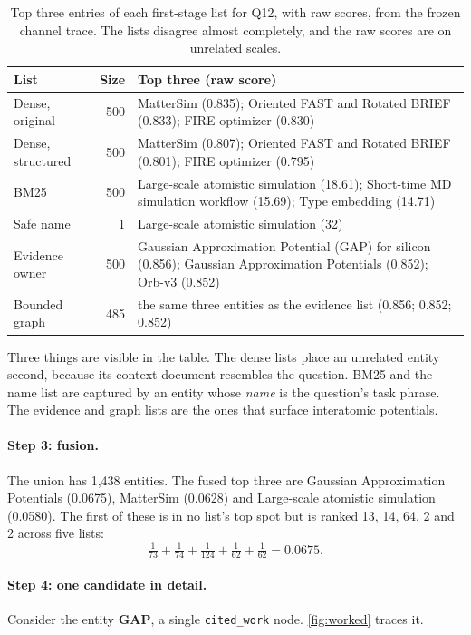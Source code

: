 \documentclass[11pt,a4paper]{article}
\newcommand{\Cref}[1]{\autoref{#1}}
\theoremstyle{remark}
\newcommand{\code}[1]{\texttt{\small #1}}
\begin{document}
\begin{table}[!htbp]
\centering
\caption[Top entries of each first-stage list for Q12]{Top three entries of each first-stage list for Q12, with raw scores, from the
frozen channel trace. The lists disagree almost completely, and the raw scores are on
unrelated scales.}
\label{tab:worked-channels}
\small
\begin{tabularx}{\linewidth}{p{3.0cm}rX}
\toprule
List & Size & Top three (raw score)\\
\midrule
Dense, original & 500 & MatterSim (0.835); Oriented FAST and Rotated BRIEF (0.833); FIRE optimizer (0.830)\\
Dense, structured & 500 & MatterSim (0.807); Oriented FAST and Rotated BRIEF (0.801); FIRE optimizer (0.795)\\
BM25 & 500 & Large-scale atomistic simulation (18.61); Short-time MD simulation workflow (15.69); Type embedding (14.71)\\
Safe name & 1 & Large-scale atomistic simulation (32)\\
Evidence owner & 500 & Gaussian Approximation Potential (GAP) for silicon (0.856); Gaussian Approximation Potentials (0.852); Orb-v3 (0.852)\\
Bounded graph & 485 & the same three entities as the evidence list (0.856; 0.852; 0.852)\\
\bottomrule
\end{tabularx}
\end{table}

Three things are visible in the table. The dense lists place an unrelated
entity second, because its context document resembles the question. BM25 and the name
list are captured by an entity whose \emph{name} is the question's task phrase. The
evidence and graph lists are the ones that surface interatomic potentials.

\paragraph{Step 3: fusion.} The union has 1{,}438 entities. The fused top three are
Gaussian Approximation Potentials (0.0675), MatterSim (0.0628) and Large-scale atomistic
simulation (0.0580). The first of these is in no list's top spot but is ranked 13, 14,
64, 2 and 2 across five lists:
\[
  \tfrac{1}{73}+\tfrac{1}{74}+\tfrac{1}{124}+\tfrac{1}{62}+\tfrac{1}{62}=0.0675 .
\]

\paragraph{Step 4: one candidate in detail.} Consider the entity \textbf{GAP}, a single
\code{cited\_work} node. \Cref{fig:worked} traces it.
\end{document}
